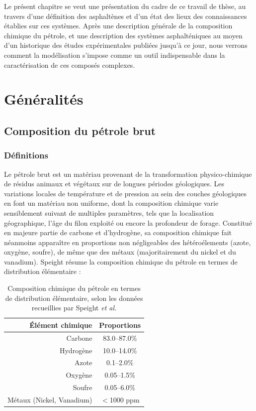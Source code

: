\documentclass[12pt,a4paper]{book}
\begin{document}
Le présent chapitre se veut une présentation du cadre de ce travail de thèse, au travers d'une définition des asphaltènes et d'un état des lieux des connaissances établies sur ces systèmes. Après une description générale de la composition chimique du pétrole, et une description des systèmes asphalténiques au moyen d'un historique des études expérimentales publiées jusqu'à ce jour, nous verrons comment la modélisation s'impose comme un outil indispensable dans la caractérisation de ces composés complexes. 




\section{Généralités}

\subsection{Composition du pétrole brut}

\subsubsection{Définitions}

Le pétrole brut est un matériau provenant de la transformation physico-chimique de résidus animaux et végétaux sur de longues périodes géologiques. Les variations locales de température et de pression au sein des couches géologiques en font un matériau non uniforme, dont la composition chimique varie sensiblement suivant de multiples paramètres, tels que la localisation géographique, l'âge du filon exploité ou encore la profondeur de forage. Constitué en majeure partie de carbone et d'hydrogène, sa composition chimique fait néanmoins apparaître en proportions non négligeables des hétéroélements (azote, oxygène, soufre), de même que des métaux (majoritairement du nickel et du vanadium). Speight \cite{speight1979some} résume la composition chimique du pétrole en termes de distribution élémentaire : 

\begin{table}[h!]
	\begin{center}
		\begin{tabular}{r|c}
			\hline
			Élément chimique & Proportions \\
			\hline
			Carbone & 83.0--87.0\% \\
			Hydrogène & 10.0--14.0\% \\
			Azote & 0.1--2.0\% \\
			Oxygène & 0.05--1.5\% \\
			Soufre & 0.05--6.0\% \\
			Métaux (Nickel, Vanadium) & $<$1000 ppm \\
			\hline
		\end{tabular}
	\end{center}
	\caption{Composition chimique du pétrole en termes de distribution élémentaire, selon les données recueillies par Speight \textit{et al.}\cite{speight1979some}}
	\label{DESpeight}
\end{table}
\end{document}
